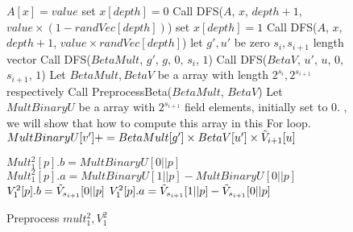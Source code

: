 {	\begin{figure}[p]
		\begin{algorithm}[H]
			\label{alg::parttwo}
			\caption{Preprocess $mult_1^2, V_1^2$}
			\begin{algorithmic}[1]
				\State $A[x]=value$
				\Else
				\State set $x[depth]=0$
				\State Call DFS($A$, $x$, $depth + 1$, $value \times (1-randVec[depth])$)
				\State set $x[depth]=1$
				\State Call DFS($A$, $x$, $depth + 1$, $value \times randVec[depth]$)
				\EndIf
				\EndProcedure
				\State let $g', u'$ be zero $s_{i}, s_{i+1}$ length vector
				\State Call {\sf DFS}($BetaMult$, $g'$, $g$, $0$, $s_{i}$, $1$)
				\State Call {\sf DFS}($BetaV$, $u'$, $u$, $0$, $s_{i + 1}$, $1$)
				\EndProcedure
				\State Let $BetaMult, BetaV$ be a array with length $2^{s_{i}}, 2^{s_{i+1}}$ respectively
				\State Call {\sf PreprocessBeta}($BetaMult$, $BetaV$)
				\State Let $MultBinaryU$ be a array with $2^{s_{i+1}}$ field elements, initially set to $0$.
				, we will show that how to compute this array in this For loop.
				\State $MultBinaryU[v'] += BetaMult[g'] \times BetaV[u'] \times \tilde{V}_{i+1}[u]$
				\EndFor
				\EndFor
				
				\State $Mult_1^2[p].b = MultBinaryU[0||p]$
				\State $Mult_1^2[p].a = MultBinaryU[1||p]-MultBinaryU[0||p]$
				\State $V_1^2[p].b = \tilde{V}_{s_{i+1}}[0||p]$
				\State $V_1^2[p].a = \tilde{V}_{s_{i+1}}[1||p]-\tilde{V}_{s_{i+1}}[0||p]$
				\EndFor
				\EndProcedure
			\end{algorithmic}
		\end{algorithm}
	\end{figure}
	
}

